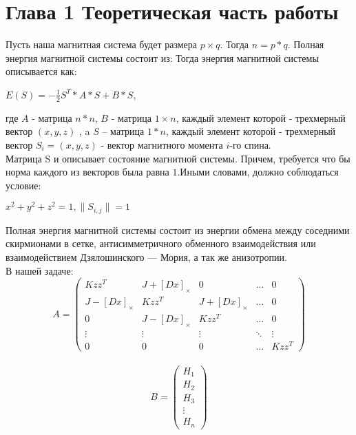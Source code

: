 \documentclass[ 12pt,x11names]{article}
\begin{document}
    \newpage
    \section{Глава 1 Теоретическая часть работы}
    Пусть наша магнитная система будет размера $p \times  q$. Тогда $n =  p * q$.
    Полная энергия магнитной системы состоит из:
    Тогда энергия магнитной системы описывается как:
    \begin{center}
    $E(S) = - \frac{1}{2}S^T*A*S + B*S$,
    \end{center}
    где $A$ - матрица $n * n$, $B$ - матрица $1 \times n$,
    каждый элемент которой - трехмерный вектор $(x, y, z)$
    , a $S$ -- матрица $1*n$, каждый элемент которой - трехмерный вектор $S_i = (x, y, z)$ - вектор магнитного момента $i$-го спина. \\
    Матрица S и описывает состояние магнитной системы.
    Причем, требуется что бы норма каждого из векторов была равна $1$.Иными словами, должно соблюдаться условие:\\
     \begin{center}
     $x^2 + y ^ 2 + z ^ 2 = 1, \|S_{i, j}\| = 1$\\
    \end{center}
    Полная энергия магнитной системы состоит из энергии обмена между соседними скирмионами в сетке,  антисимметричного обменного взаимодействия или взаимодействием Дзялошинского — Мория, а так же анизотропии.\\
    В нашей задаче:
    \begin{equation*}
    A = \left(
    \begin{array}{ccccс}
    Kzz^T & J + [Dx]_\times & 0  & \ldots & 0\\
    J - [Dx]_\times & Kzz^T & J + [Dx]_\times &\ldots & 0\\
    0 & J - [Dx]_\times & Kzz^T &\ldots & 0\\
    \vdots &\vdots &\vdots &\ddots & \vdots\\
    0 & 0 &  0 &\ldots & Kzz^T
    \end{array}
    \right)
    \end{equation*}\\
     \begin{equation*}
    B = \left(
    \begin{array}{c}
    H_1\\
    H_2\\
    H_3\\
    \vdots\\
    H_n
    \end{array}
    \right)
    \end{equation*}\\
\end{document}
